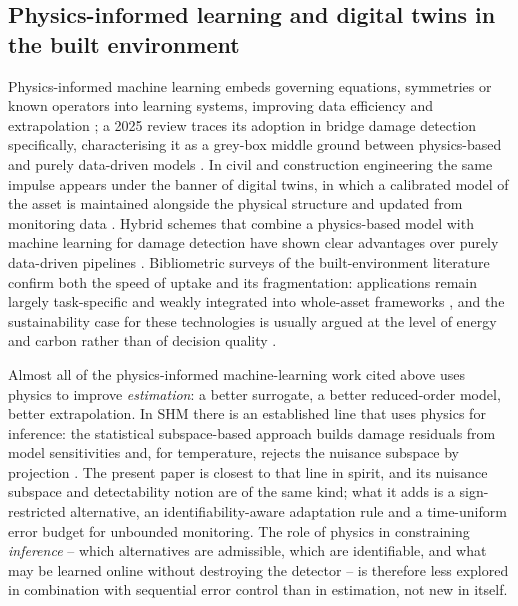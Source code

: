 \documentclass[12pt,a4paper]{article}
\newcommand{\rev}[1]{#1}
\newcommand{\rev}[1]{{\color{revcol}#1}}
\begin{document}
\subsection{Physics-informed learning and digital twins in the built environment}

Physics-informed machine learning embeds governing equations, symmetries or known operators into learning systems, improving data efficiency and extrapolation \citep{karniadakis2021piml,raissi2019pinn}; a 2025 review traces its adoption in bridge damage detection specifically, characterising it as a grey-box middle ground between physics-based and purely data-driven models \citep{mammeri2025piml}. In civil and construction engineering the same impulse appears under the banner of digital twins, in which a calibrated model of the asset is maintained alongside the physical structure and updated from monitoring data \citep{jiang2021dtcivil,opoku2021dtreview,ferrari2024twins}. Hybrid schemes that combine a physics-based model with machine learning for damage detection have shown clear advantages over purely data-driven pipelines \citep{ritto2021digitaltwin}. Bibliometric surveys of the built-environment literature confirm both the speed of uptake and its fragmentation: applications remain largely task-specific and weakly integrated into whole-asset frameworks \citep{wang2026aidt}, and the sustainability case for these technologies is usually argued at the level of energy and carbon rather than of decision quality \citep{bibri2025aidt}.

Almost all of the physics-informed machine-learning work cited above uses physics to improve \emph{estimation}: a better surrogate, a better reduced-order model, better extrapolation. \rev{In SHM there is an established line that uses physics for inference: the statistical subspace-based approach builds damage residuals from model sensitivities and, for temperature, rejects the nuisance subspace by projection \citep{basseville2004subspace,balmes2009temperature}. The present paper is closest to that line in spirit, and its nuisance subspace and detectability notion are of the same kind; what it adds is a sign-restricted alternative, an identifiability-aware adaptation rule and a time-uniform error budget for unbounded monitoring.} The role of physics in constraining \emph{inference} -- which alternatives are admissible, which are identifiable, and what may be learned online without destroying the detector -- is therefore \rev{less explored in combination with sequential error control than in estimation, not new in itself.}
\end{document}
